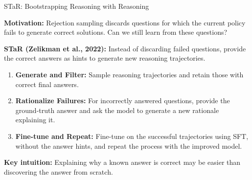 \documentclass[aspectratio=169]{beamer}
\begin{document}
\begin{frame}{STaR: Bootstrapping Reasoning with Reasoning}

\textbf{Motivation:} Rejection sampling discards questions for which the current policy fails to generate correct solutions. Can we still learn from these questions?

\vspace{0.3cm}

\textbf{STaR (Zelikman et al., 2022):} Instead of discarding failed questions, provide the correct answers as hints to generate new reasoning trajectories.

\begin{enumerate}
    \item \textbf{Generate and Filter:}
    Sample reasoning trajectories and retain those with correct final answers.

    \item \textbf{Rationalize Failures:}
    For incorrectly answered questions, provide the ground-truth answer and ask the model to generate a new rationale explaining it.

    \item \textbf{Fine-tune and Repeat:}
    Fine-tune on the successful trajectories using SFT, without the answer hints, and repeat the process with the improved model.
\end{enumerate}

\vspace{0.2cm}

\textbf{Key intuition:} Explaining why a known answer is correct may be easier than discovering the answer from scratch.

\end{frame}
\end{document}
